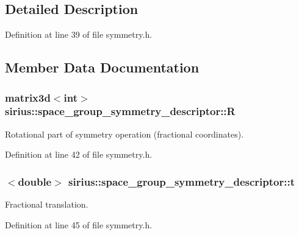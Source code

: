 \subsection{Detailed Description}


Definition at line 39 of file symmetry.\+h.



\subsection{Member Data Documentation}
\hypertarget{structsirius_1_1space__group__symmetry__descriptor_afc69dbb8d30ba338514ad1185aa44edc}{}
\subsubsection[{R}]{\setlength{\rightskip}{0pt plus 5cm}matrix3d$<$int$>$ sirius\+::space\+\_\+group\+\_\+symmetry\+\_\+descriptor\+::\+R}\label{structsirius_1_1space__group__symmetry__descriptor_afc69dbb8d30ba338514ad1185aa44edc}


Rotational part of symmetry operation (fractional coordinates). 



Definition at line 42 of file symmetry.\+h.

\hypertarget{structsirius_1_1space__group__symmetry__descriptor_a5c8edab1a7cf0333197091a12e0a2707}{}
\subsubsection[{t}]{$<$double$>$ sirius\+::space\+\_\+group\+\_\+symmetry\+\_\+descriptor\+::t}\label{structsirius_1_1space__group__symmetry__descriptor_a5c8edab1a7cf0333197091a12e0a2707}


Fractional translation. 



Definition at line 45 of file symmetry.\+h.

\hypertarget{structsirius_1_1space__group__symmetry__descriptor_a50795c4d0bc499797b69b9386bc39724}{}
